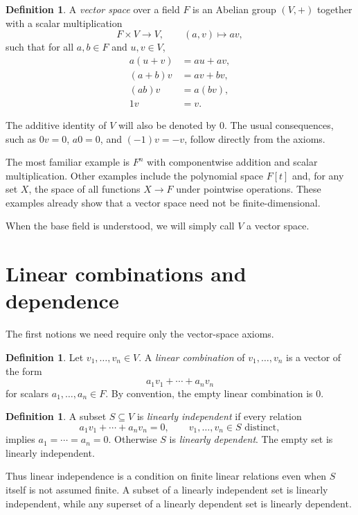 \documentclass{amsbook}
\theoremstyle{definition}
\newtheorem{definition}[theorem]{Definition}
\theoremstyle{remark}
\numberwithin{section}{chapter}
\numberwithin{equation}{chapter}
\begin{document}
\begin{definition}
	A \emph{vector space} over a field $F$ is an Abelian group $(V,+)$ together with a scalar multiplication
	\[
	F\times V\longrightarrow V,\qquad (a,v)\longmapsto av,
	\]
	such that for all $a,b\in F$ and $u,v\in V$,
	\[
	\begin{split}
	a(u+v)&=au+av,\\
	(a+b)v&=av+bv,\\
	(ab)v&=a(bv),\\
	1v&=v.
	\end{split}
	\]
\end{definition}

The additive identity of $V$ will also be denoted by $0$. The usual consequences, such as $0v=0$, $a0=0$, and $(-1)v=-v$, follow directly from the axioms.

The most familiar example is $F^n$ with componentwise addition and scalar multiplication. Other examples include the polynomial space $F[t]$ and, for any set $X$, the space of all functions $X\to F$ under pointwise operations. These examples already show that a vector space need not be finite-dimensional.

When the base field is understood, we will simply call $V$ a vector space.

\section{Linear combinations and dependence}

The first notions we need require only the vector-space axioms.

\begin{definition}
	Let $v_1,\dots,v_n\in V$. A \emph{linear combination} of $v_1,\dots,v_n$ is a vector of the form
	\[
	a_1v_1+\cdots+a_nv_n
	\]
	for scalars $a_1,\dots,a_n\in F$. By convention, the empty linear combination is $0$.
\end{definition}

\begin{definition}
	A subset $S\subseteq V$ is \emph{linearly independent} if every relation
	\[
	a_1v_1+\cdots+a_nv_n=0,
	\qquad v_1,\dots,v_n\in S \text{ distinct},
	\]
	implies $a_1=\cdots=a_n=0$. Otherwise $S$ is \emph{linearly dependent}. The empty set is linearly independent.
\end{definition}

Thus linear independence is a condition on finite linear relations even when $S$ itself is not assumed finite. A subset of a linearly independent set is linearly independent, while any superset of a linearly dependent set is linearly dependent.
\end{document}
